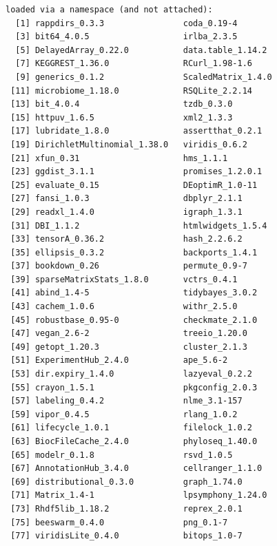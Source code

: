 \documentclass[
]{book}
\begin{document}
\begin{verbatim}
loaded via a namespace (and not attached):
  [1] rappdirs_0.3.3                coda_0.19-4                  
  [3] bit64_4.0.5                   irlba_2.3.5                  
  [5] DelayedArray_0.22.0           data.table_1.14.2            
  [7] KEGGREST_1.36.0               RCurl_1.98-1.6               
  [9] generics_0.1.2                ScaledMatrix_1.4.0           
 [11] microbiome_1.18.0             RSQLite_2.2.14               
 [13] bit_4.0.4                     tzdb_0.3.0                   
 [15] httpuv_1.6.5                  xml2_1.3.3                   
 [17] lubridate_1.8.0               assertthat_0.2.1             
 [19] DirichletMultinomial_1.38.0   viridis_0.6.2                
 [21] xfun_0.31                     hms_1.1.1                    
 [23] ggdist_3.1.1                  promises_1.2.0.1             
 [25] evaluate_0.15                 DEoptimR_1.0-11              
 [27] fansi_1.0.3                   dbplyr_2.1.1                 
 [29] readxl_1.4.0                  igraph_1.3.1                 
 [31] DBI_1.1.2                     htmlwidgets_1.5.4            
 [33] tensorA_0.36.2                hash_2.2.6.2                 
 [35] ellipsis_0.3.2                backports_1.4.1              
 [37] bookdown_0.26                 permute_0.9-7                
 [39] sparseMatrixStats_1.8.0       vctrs_0.4.1                  
 [41] abind_1.4-5                   tidybayes_3.0.2              
 [43] cachem_1.0.6                  withr_2.5.0                  
 [45] robustbase_0.95-0             checkmate_2.1.0              
 [47] vegan_2.6-2                   treeio_1.20.0                
 [49] getopt_1.20.3                 cluster_2.1.3                
 [51] ExperimentHub_2.4.0           ape_5.6-2                    
 [53] dir.expiry_1.4.0              lazyeval_0.2.2               
 [55] crayon_1.5.1                  pkgconfig_2.0.3              
 [57] labeling_0.4.2                nlme_3.1-157                 
 [59] vipor_0.4.5                   rlang_1.0.2                  
 [61] lifecycle_1.0.1               filelock_1.0.2               
 [63] BiocFileCache_2.4.0           phyloseq_1.40.0              
 [65] modelr_0.1.8                  rsvd_1.0.5                   
 [67] AnnotationHub_3.4.0           cellranger_1.1.0             
 [69] distributional_0.3.0          graph_1.74.0                 
 [71] Matrix_1.4-1                  lpsymphony_1.24.0            
 [73] Rhdf5lib_1.18.2               reprex_2.0.1                 
 [75] beeswarm_0.4.0                png_0.1-7                    
 [77] viridisLite_0.4.0             bitops_1.0-7                 

\end{verbatim}
\end{document}
